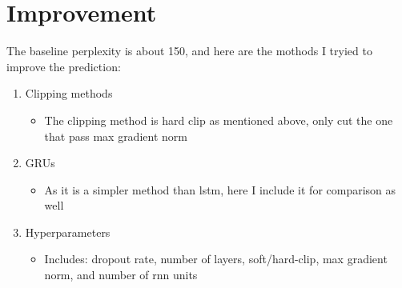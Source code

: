 \documentclass{article}
\begin{document}
\section{Improvement}
The baseline perplexity is about 150, and here are the mothods I tryied to improve the prediction:
\begin{enumerate}
   \item Clipping methods
   \begin{itemize}
     \item The clipping method is hard clip as mentioned above, only cut the one that pass max gradient norm
   \end{itemize}
   \item GRUs
   \begin{itemize}
     \item As it is a simpler method than lstm, here I include it for comparison as well
   \end{itemize}
   \item Hyperparameters
   \begin{itemize}
     \item Includes: dropout rate, number of layers, soft/hard-clip, max gradient norm, and number of rnn units
   \end{itemize}
\end{enumerate}
\end{document}
